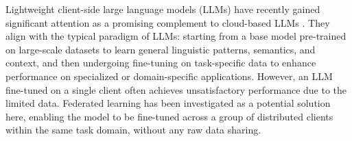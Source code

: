 \documentclass{article} %
\theoremstyle{plain}
\theoremstyle{definition}
\begin{document}

Lightweight client-side large language models (LLMs) have recently gained significant attention as a promising complement to cloud-based LLMs \citep{fan2024device}. They align with the typical paradigm of LLMs: starting from a base model pre-trained on large-scale datasets to learn general linguistic patterns, semantics, and context, and then undergoing fine-tuning on task-specific data to enhance performance on specialized or domain-specific applications. However, an LLM fine-tuned on a single client often achieves unsatisfactory performance due to the limited data. Federated learning \citep{mcmahan2017communication, chen2023federated} has been investigated as a potential solution here, enabling the model to be fine-tuned across a group of distributed clients within the same task domain, without any raw data sharing.
\end{document}

